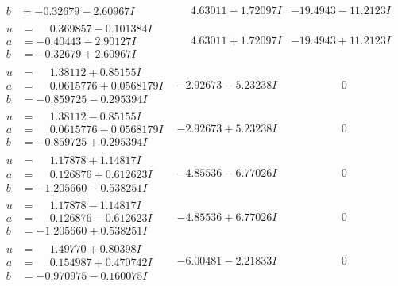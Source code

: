 \documentclass[1p]{elsarticle_modified}
\theoremstyle{definition}
\begin{document}
$$\begin{array}{c|c|c}
\begin{aligned}
b &= -0.32679 - 2.60967 I\end{aligned}
 & \phantom{-}4.63011 - 1.72097 I & -19.4943 - 11.2123 I \\ \hline\begin{aligned}
u &= \phantom{-}0.369857 - 0.101384 I \\
a &= -0.40443 - 2.90127 I \\
b &= -0.32679 + 2.60967 I\end{aligned}
 & \phantom{-}4.63011 + 1.72097 I & -19.4943 + 11.2123 I \\ \hline\begin{aligned}
u &= \phantom{-}1.38112 + 0.85155 I \\
a &= \phantom{-}0.0615776 + 0.0568179 I \\
b &= -0.859725 - 0.295394 I\end{aligned}
 & -2.92673 - 5.23238 I & \phantom{-0.000000 } 0 \\ \hline\begin{aligned}
u &= \phantom{-}1.38112 - 0.85155 I \\
a &= \phantom{-}0.0615776 - 0.0568179 I \\
b &= -0.859725 + 0.295394 I\end{aligned}
 & -2.92673 + 5.23238 I & \phantom{-0.000000 } 0 \\ \hline\begin{aligned}
u &= \phantom{-}1.17878 + 1.14817 I \\
a &= \phantom{-}0.126876 + 0.612623 I \\
b &= -1.205660 - 0.538251 I\end{aligned}
 & -4.85536 - 6.77026 I & \phantom{-0.000000 } 0 \\ \hline\begin{aligned}
u &= \phantom{-}1.17878 - 1.14817 I \\
a &= \phantom{-}0.126876 - 0.612623 I \\
b &= -1.205660 + 0.538251 I\end{aligned}
 & -4.85536 + 6.77026 I & \phantom{-0.000000 } 0 \\ \hline\begin{aligned}
u &= \phantom{-}1.49770 + 0.80398 I \\
a &= \phantom{-}0.154987 + 0.470742 I \\
b &= -0.970975 - 0.160075 I\end{aligned}
 & -6.00481 - 2.21833 I & \phantom{-0.000000 } 0 \\ \hline\begin{aligned}

\end{aligned}
\end{array}$$
\end{document}
